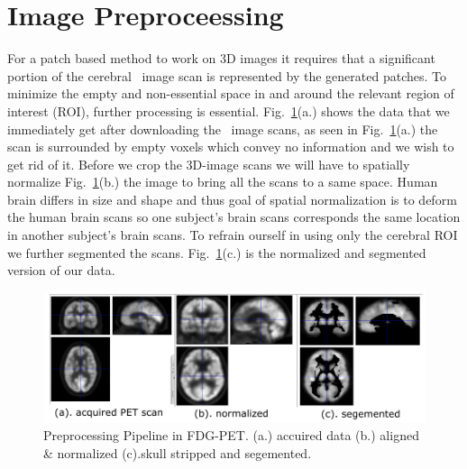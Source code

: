 \section{Image Preproceessing}
\label{sec:image_preprocessing}
For a patch based method to work on 3D images it requires that a significant portion of the cerebral \FDGPET ~image scan is represented by the generated patches. To minimize the empty and non-essential space in and around the relevant region of interest (ROI), further processing is essential. Fig.~\ref{fig:preprocessing}(a.) shows the data that we immediately get after downloading the \FDGPET ~image scans, as seen in Fig.~\ref{fig:preprocessing}(a.) the scan is surrounded by empty voxels which convey no information and we wish to get rid of it. Before we crop the 3D-image scans we will have to spatially normalize Fig.~\ref{fig:preprocessing}(b.) the image to bring all the scans to a same space. Human brain differs in size and shape and thus goal of spatial normalization is to deform the human brain scans so one subject's brain scans corresponds the same location in another subject's brain scans. To refrain ourself in using only the cerebral ROI we further segmented the scans. Fig.~\ref{fig:preprocessing}(c.) is the normalized and segmented version of our data. 
\begin{figure}[h]
	\centering
	\includegraphics[width=\linewidth]{figures/preprocessing}
	\caption[Prepocessing Pipeline]{Preprocessing Pipeline in FDG-PET. (a.) accuired data (b.) aligned \& normalized (c).skull stripped and segemented.}
	\label{fig:preprocessing}
\end{figure}
    
